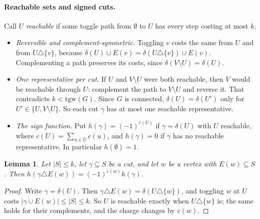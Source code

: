 \documentclass[11pt]{article}
\newtheorem{lemma}[theorem]{Lemma}
\theoremstyle{definition}
\theoremstyle{remark}
\newcommand{\tgw}{\mathrm{tgw}}
\begin{document}
\paragraph{Reachable sets and signed cuts.} Call $U$ \emph{reachable} if some
toggle path from $\emptyset$ to $U$ has every step costing at most $k$.
\begin{itemize}
\item \emph{Reversible and complement-symmetric.} Toggling $v$ costs the same
from $U$ and from $U\triangle\{v\}$, because
$\delta(U)\cup E(v)=\delta(U\triangle\{v\})\cup E(v)$. Complementing a path
preserves its costs, since $\delta(V\setminus U)=\delta(U)$.
\item \emph{One representative per cut.} If $U$ and $V\setminus U$ were both
reachable, then $V$ would be reachable through $U$: complement the path to
$V\setminus U$ and reverse it. That contradicts $k<\tgw(G)$. Since $G$ is
connected, $\delta(U)=\delta(U')$ only for $U'\in\{U,V\setminus U\}$. So each
cut $\gamma$ has at most one reachable representative.
\item \emph{The sign function.} Put $h(\gamma)=(-1)^{c(U)}$ if $\gamma=\delta(U)$
with $U$ reachable, where $c(U)=\sum_{u\in U}c(u)$, and $h(\gamma)=0$ if
$\gamma$ has no reachable representative. In particular $h(\emptyset)=1$.
\end{itemize}

\begin{lemma}\label{lem:relation}
Let $|S|\le k$, let $\gamma\subseteq S$ be a cut, and let $w$ be a vertex with
$E(w)\subseteq S$. Then $h(\gamma\triangle E(w))=(-1)^{c(w)}h(\gamma)$.
\end{lemma}

\begin{proof}
Write $\gamma=\delta(U)$. Then $\gamma\triangle E(w)=\delta(U\triangle\{w\})$,
and toggling $w$ at $U$ costs $|\gamma\cup E(w)|\le|S|\le k$. So $U$ is
reachable exactly when $U\triangle\{w\}$ is; the same holds for their
complements, and the charge changes by $c(w)$. \qedhere
\end{proof}
\end{document}
